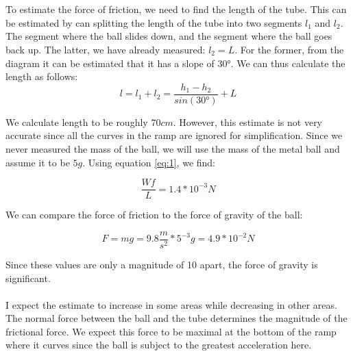 \documentclass{article}
\begin{document}
\\\\
To estimate the force of friction, we need to find the length of the tube. This can be estimated by can splitting the length of the tube into two segments $l_{1}$ and $l_{2}$. The segment where the ball slides down, and the segment where the ball goes back up. The latter, we have already measured: $l_{2} = L$. For the former, from the diagram it can be estimated that it has a slope of $\ang{30}$. We can thus calculate the length as follows: 
\begin{equation}
l = l_{1} + l_{2} = \frac{h_{1} - h_{2}}{sin(\ang{30})}+ L
\end{equation}

We calculate length to be roughly $70 \si{cm}$. However, this estimate is not very accurate since all the curves in the ramp are ignored for simplification. Since we never measured the mass of the ball, we will use the mass of the metal ball and assume it to be $5 \si{g}$. Using equation \eqref{eq:1}, we find:

\begin{equation}
    \frac{Wf}{L} = 1.4 * 10^{-3} \si{N}
\end{equation}

We can compare the force of friction to the force of gravity of the ball:

\begin{equation}
F = mg = 9.8\frac{\si{m}}{\si{s}^{2}} * 5^{-3} \si{g} = 4.9 * 10^{-2} \si{N}
\end{equation}

Since these values are only a magnitude of 10 apart, the force of gravity is significant.
\\\\
I expect the estimate to increase in some areas while decreasing in other areas. The normal force between the ball and the tube determines the magnitude of the frictional force. We expect this force to be maximal at the bottom of the ramp where it curves since the ball is subject to the greatest acceleration here.


 

 

 
\end{document}
